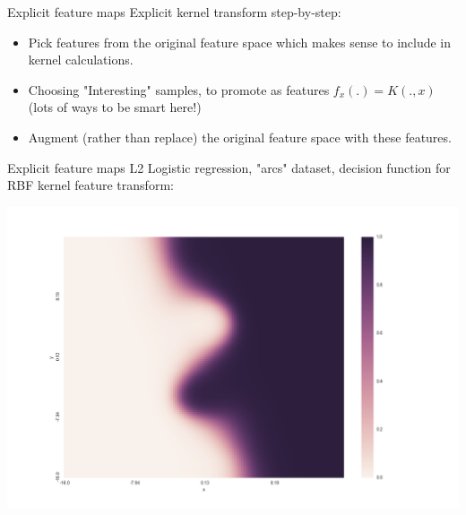 \documentclass[11pt]{beamer}
\begin{document}
\begin{frame}{Explicit feature maps}
Explicit kernel transform step-by-step:
\begin{itemize}
\item Pick features from the original feature space which makes sense to include in kernel calculations.
\item Choosing "Interesting" samples, to promote as features $f_x(.) = K(., x)$ (lots of ways to be smart here!)
\item Augment (rather than replace) the original feature space with these features.
\end{itemize}
\end{frame}

\begin{frame}{Explicit feature maps}
L2 Logistic regression, "arcs" dataset, decision function for RBF kernel feature transform:
\begin{center}
\includegraphics[scale=0.20]{arcs_transform.png}
\end{center}
\end{frame}
\end{document}
